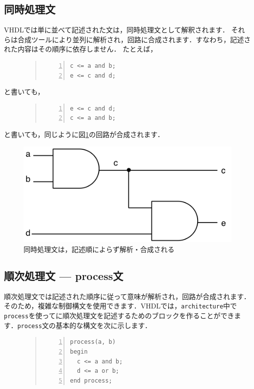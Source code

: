 \documentclass[a4paper,dvipdfmx]{jsarticle}
\begin{document}
\subsection{同時処理文}
VHDLでは単に並べて記述された文は，同時処理文として解釈されます．
それらは合成ツールにより並列に解析され，回路に合成されます．すなわち，記述された内容はその順序に依存しません．
たとえば，
\begin{figure}[H]
\begin{quote}
\begin{Verbatim}[frame=single, numbers=left, baselinestretch=0.8]
c <= a and b;
e <= c and d;
\end{Verbatim}
\end{quote}
\end{figure}
と書いても，
\begin{figure}[H]
\begin{quote}
\begin{Verbatim}[frame=single, numbers=left, baselinestretch=0.8]
e <= c and d;
c <= a and b;
\end{Verbatim}
\end{quote}
\end{figure}
と書いても，同じように図\ref{fig:parallel_vhdl}の回路が合成されます．

 \begin{figure}[H]
  \begin{center}
   \includegraphics[width=.4\textwidth]{chapter02_figures/parallel_vhdl.png}
  \end{center}
  \caption{同時処理文は，記述順によらず解析・合成される \label{fig:parallel_vhdl}}
 \end{figure}


\subsection{順次処理文 --- process文}
順次処理文では記述された順序に従って意味が解析され，回路が合成されます．そのため，複雑な制御構文を使用できます．VHDLでは，\verb|architecture|中で\verb|process|を使ってに順次処理文を記述するためのブロックを作ることができます．\verb|process|文の基本的な構文を次に示します．
\begin{figure}[H]
\begin{quote}
\begin{Verbatim}[frame=single, numbers=left, baselinestretch=0.8]
process(a, b)
begin
  c <= a and b;
  d <= a or b;
end process;
\end{Verbatim}
\end{quote}
\end{figure}
\end{document}
